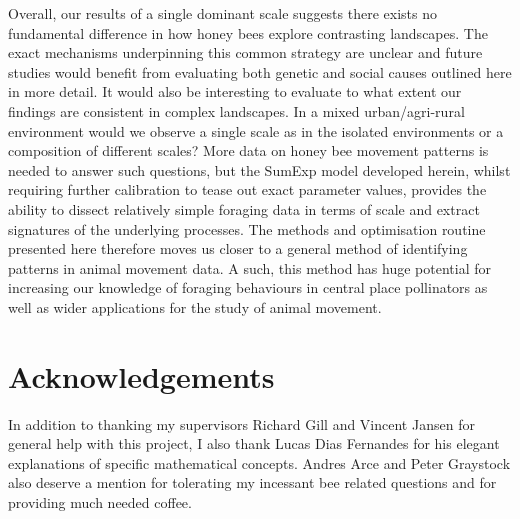 \documentclass[11pt,usenames,dvipsnames,a4paper]{article}
\begin{document}
\begin{linenumbers}
Overall, our results of a single dominant scale suggests there exists no fundamental difference in how honey bees explore contrasting landscapes. The exact mechanisms underpinning this common strategy are unclear and future studies would benefit from evaluating both genetic and social causes outlined here in more detail. It would also be interesting to evaluate to what extent our findings are consistent in complex landscapes. In a mixed urban/agri-rural environment would we observe a single scale as in the isolated environments or a composition of different scales? More data on honey bee movement patterns is needed to answer such questions, but the SumExp model developed herein, whilst requiring further calibration to tease out exact parameter values, provides the ability to dissect relatively simple foraging data in terms of scale and extract signatures of the underlying processes. The methods and optimisation routine presented here therefore moves us closer to a general method of identifying patterns in animal movement data. A such, this method has huge potential for increasing our knowledge of foraging behaviours in central place pollinators as well as wider applications for the study of animal movement.
\end{linenumbers}

\section{Acknowledgements}

In addition to thanking my supervisors Richard Gill and Vincent Jansen for general help with this project, I also thank Lucas Dias Fernandes for his elegant explanations of specific mathematical concepts. Andres Arce and Peter Graystock also deserve a mention for tolerating my incessant bee related questions and for providing much needed coffee.




\end{document}
